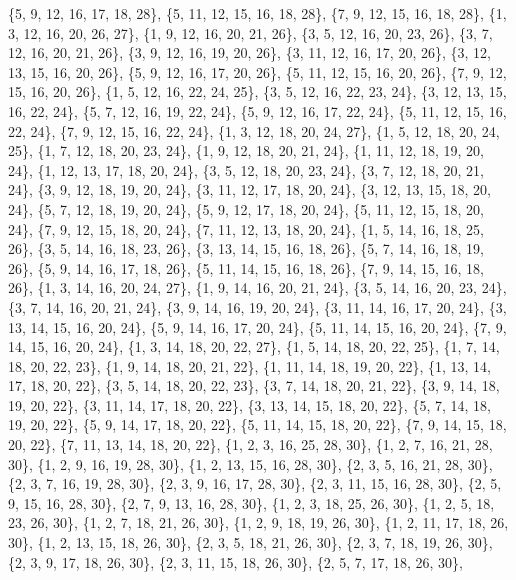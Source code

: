 \documentclass[11pt,a4paper]{article}
\begin{document}
{\{5, 9, 12, 16, 17, 18, 28\}, \{5, 11, 12, 15, 16, 18, 28\}, \{7, 9, 12, 15, 16, 18, 28\}, \{1, 3, 12, 16, 20, 26, 27\}, \{1, 9, 12, 16, 20, 21, 26\},
\{3, 5, 12, 16, 20, 23, 26\}, \{3, 7, 12, 16, 20, 21, 26\}, \{3, 9, 12, 16, 19, 20, 26\}, \{3, 11, 12, 16, 17, 20, 26\}, \{3, 12, 13, 15, 16, 20, 26\},
\{5, 9, 12, 16, 17, 20, 26\}, \{5, 11, 12, 15, 16, 20, 26\}, \{7, 9, 12, 15, 16, 20, 26\}, \{1, 5, 12, 16, 22, 24, 25\}, \{3, 5, 12, 16, 22, 23, 24\},
\{3, 12, 13, 15, 16, 22, 24\}, \{5, 7, 12, 16, 19, 22, 24\}, \{5, 9, 12, 16, 17, 22, 24\}, \{5, 11, 12, 15, 16, 22, 24\}, \{7, 9, 12, 15, 16, 22, 24\},
\{1, 3, 12, 18, 20, 24, 27\}, \{1, 5, 12, 18, 20, 24, 25\}, \{1, 7, 12, 18, 20, 23, 24\}, \{1, 9, 12, 18, 20, 21, 24\}, \{1, 11, 12, 18, 19, 20, 24\},
\{1, 12, 13, 17, 18, 20, 24\}, \{3, 5, 12, 18, 20, 23, 24\}, \{3, 7, 12, 18, 20, 21, 24\}, \{3, 9, 12, 18, 19, 20, 24\}, \{3, 11, 12, 17, 18, 20, 24\},
\{3, 12, 13, 15, 18, 20, 24\}, \{5, 7, 12, 18, 19, 20, 24\}, \{5, 9, 12, 17, 18, 20, 24\}, \{5, 11, 12, 15, 18, 20, 24\}, \{7, 9, 12, 15, 18, 20, 24\},
\{7, 11, 12, 13, 18, 20, 24\}, \{1, 5, 14, 16, 18, 25, 26\}, \{3, 5, 14, 16, 18, 23, 26\}, \{3, 13, 14, 15, 16, 18, 26\}, \{5, 7, 14, 16, 18, 19, 26\},
\{5, 9, 14, 16, 17, 18, 26\}, \{5, 11, 14, 15, 16, 18, 26\}, \{7, 9, 14, 15, 16, 18, 26\}, \{1, 3, 14, 16, 20, 24, 27\}, \{1, 9, 14, 16, 20, 21, 24\},
\{3, 5, 14, 16, 20, 23, 24\}, \{3, 7, 14, 16, 20, 21, 24\}, \{3, 9, 14, 16, 19, 20, 24\}, \{3, 11, 14, 16, 17, 20, 24\}, \{3, 13, 14, 15, 16, 20, 24\},
\{5, 9, 14, 16, 17, 20, 24\}, \{5, 11, 14, 15, 16, 20, 24\}, \{7, 9, 14, 15, 16, 20, 24\}, \{1, 3, 14, 18, 20, 22, 27\}, \{1, 5, 14, 18, 20, 22, 25\},
\{1, 7, 14, 18, 20, 22, 23\}, \{1, 9, 14, 18, 20, 21, 22\}, \{1, 11, 14, 18, 19, 20, 22\}, \{1, 13, 14, 17, 18, 20, 22\}, \{3, 5, 14, 18, 20, 22, 23\},
\{3, 7, 14, 18, 20, 21, 22\}, \{3, 9, 14, 18, 19, 20, 22\}, \{3, 11, 14, 17, 18, 20, 22\}, \{3, 13, 14, 15, 18, 20, 22\}, \{5, 7, 14, 18, 19, 20, 22\},
\{5, 9, 14, 17, 18, 20, 22\}, \{5, 11, 14, 15, 18, 20, 22\}, \{7, 9, 14, 15, 18, 20, 22\}, \{7, 11, 13, 14, 18, 20, 22\}, \{1, 2, 3, 16, 25, 28, 30\},
\{1, 2, 7, 16, 21, 28, 30\}, \{1, 2, 9, 16, 19, 28, 30\}, \{1, 2, 13, 15, 16, 28, 30\}, \{2, 3, 5, 16, 21, 28, 30\}, \{2, 3, 7, 16, 19, 28, 30\},
\{2, 3, 9, 16, 17, 28, 30\}, \{2, 3, 11, 15, 16, 28, 30\}, \{2, 5, 9, 15, 16, 28, 30\}, \{2, 7, 9, 13, 16, 28, 30\}, \{1, 2, 3, 18, 25, 26, 30\},
\{1, 2, 5, 18, 23, 26, 30\}, \{1, 2, 7, 18, 21, 26, 30\}, \{1, 2, 9, 18, 19, 26, 30\}, \{1, 2, 11, 17, 18, 26, 30\}, \{1, 2, 13, 15, 18, 26, 30\},
\{2, 3, 5, 18, 21, 26, 30\}, \{2, 3, 7, 18, 19, 26, 30\}, \{2, 3, 9, 17, 18, 26, 30\}, \{2, 3, 11, 15, 18, 26, 30\}, \{2, 5, 7, 17, 18, 26, 30\},
}
\end{document}
